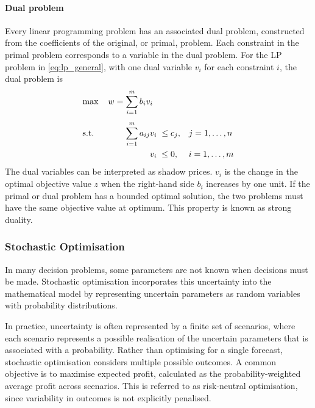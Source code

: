 \paragraph{Dual problem}
Every linear programming problem has an associated dual problem, constructed from the coefficients of the original, or primal, problem. Each constraint in the primal problem corresponds to a variable in the dual problem.
For the LP problem in \eqref{eq:lp_general}, with one dual variable $v_i$ for each constraint $i$, the dual problem is
\begin{equation}
\begin{array}{@{}l@{\hspace{3.2em}}l@{\;\;}l@{\quad}l@{}}
\max & \llap{$w={}$}{\displaystyle\sum_{i=1}^{m}}\, b_i v_i & & \\[4ex]
\text{s.t.} & {\displaystyle\sum_{i=1}^{m}}\, a_{ij} v_i & \le c_j, & j = 1,\ldots,n\\[3ex]
 & \multicolumn{1}{r@{\;\;}}{v_i} & \le 0, & i = 1,\ldots,m
\end{array}
\label{eq:lp_dual}
\end{equation}
The dual variables can be interpreted as shadow prices. $v_i$ is the change in the optimal objective value $z$ when the right-hand side $b_i$ increases by one unit. If the primal or dual problem has a bounded optimal solution, the two problems must have the same objective value at optimum. This property is known as strong duality. %


\subsubsection{Stochastic Optimisation}
\label{subsec:stochastic_optimisation}

In many decision problems, some parameters are not known when decisions must be made. Stochastic optimisation incorporates this uncertainty into the mathematical model by representing uncertain parameters as random variables with probability distributions. %

In practice, uncertainty is often represented by a finite set of scenarios, where each scenario represents a possible realisation of the uncertain parameters that is associated with a probability. Rather than optimising for a single forecast, stochastic optimisation considers multiple possible outcomes. A common objective is to maximise expected profit, calculated as the probability-weighted average profit across scenarios. This is referred to as risk-neutral optimisation, since variability in outcomes is not explicitly penalised. %

